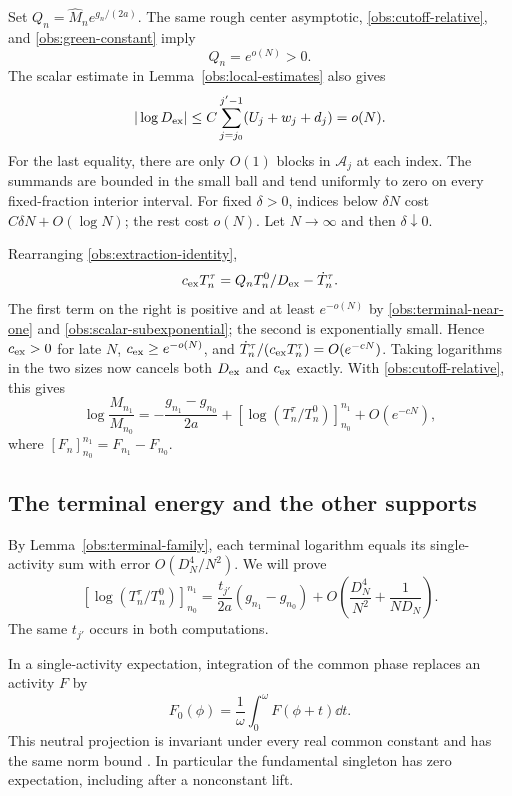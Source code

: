 Set \(Q_n=\widehat M_n e^{g_n/(2a)}\).  The same rough center
asymptotic, \eqref{obs:cutoff-relative}, and
\eqref{obs:green-constant} imply
\[
                         Q_n=e^{o(N)}>0.
\]
The scalar estimate in Lemma~\ref{obs:local-estimates} also gives
\begin{equation}\label{obs:scalar-subexponential}
 |\log D_{\rm ex}|
   \le C\sum_{j=j_0}^{j'-1}(U_j+w_j+d_j)=o(N).
\end{equation}
For the last equality, there are only \(O(1)\) blocks in
\(\mathcal A_j\) at each index.  The summands are bounded in the
small ball and tend uniformly to zero on every fixed-fraction
interior interval.  For fixed \(\delta>0\), indices below
\(\delta N\) cost \(C\delta N+O(\log N)\); the rest cost \(o(N)\).
Let \(N\to\infty\) and then \(\delta\downarrow0\).

Rearranging \eqref{obs:extraction-identity},
\[
 c_{\rm ex}T_n^\tau
       =Q_n T_n^0/D_{\rm ex}-\dot T_n^\tau.
\]
The first term on the right is positive and at least \(e^{-o(N)}\)
by \eqref{obs:terminal-near-one} and
\eqref{obs:scalar-subexponential}; the second is exponentially
small.  Hence \(c_{\rm ex}>0\) for late \(N\),
\(c_{\rm ex}\ge e^{-o(N)}\), and
\(\dot T_n^\tau/(c_{\rm ex}T_n^\tau)=O(e^{-cN})\).
Taking logarithms in the two sizes now cancels both
\(D_{\rm ex}\) and \(c_{\rm ex}\) exactly.  With
\eqref{obs:cutoff-relative}, this gives
\begin{equation}\label{obs:after-cancellation}
 \log\frac{M_{n_1}}{M_{n_0}}
 =-\frac{g_{n_1}-g_{n_0}}{2a}
    +\left[\log(T_n^\tau/T_n^0)\right]_{n_0}^{n_1}
    +O(e^{-cN}),
\end{equation}
where \([F_n]_{n_0}^{n_1}=F_{n_1}-F_{n_0}\).

\subsection{The terminal energy and the other supports}

By Lemma~\ref{obs:terminal-family}, each terminal logarithm equals
its single-activity sum with error \(O(D_N^4/N^2)\).  We will prove
\begin{equation}\label{obs:terminal-energy}
 \left[\log(T_n^\tau/T_n^0)\right]_{n_0}^{n_1}
  =\frac{t_{j'}}{2a}(g_{n_1}-g_{n_0})
       +O\left(\frac{D_N^4}{N^2}+\frac{1}{ND_N}\right).
\end{equation}
The same \(t_{j'}\) occurs in both computations.

In a single-activity expectation, integration of the common phase
replaces an activity \(F\) by
\[
             F_0(\phi)=\frac1\omega\int_0^\omega F(\phi+t)\dd t.
\]
This neutral projection is invariant under every real common
constant and has the same norm bound
\cite[Section~4.3, before Lemma~4.5]{B}.  In particular the
fundamental singleton has zero expectation, including after a
nonconstant lift.

